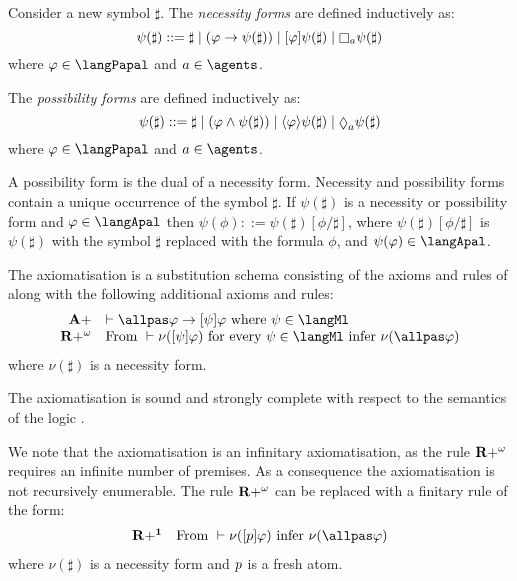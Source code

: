 \begin{definition}
Consider a new symbol $\sharp$. The {\em necessity forms} are defined inductively as:
$$\psi(\sharp) ::= \sharp \mid (\phi \implies \psi(\sharp)) \mid \announceA{\phi} \psi(\sharp) \mid \knows[\agentA] \psi(\sharp)$$
where $\phi \in \langPapal$ and $\agentA \in \agents$.

The {\em possibility forms} are defined inductively as:
$$\psi(\sharp) ::= \sharp \mid (\phi \land \psi(\sharp)) \mid \announceE{\phi} \psi(\sharp) \mid \suspects[\agentA] \psi(\sharp)$$
where $\phi \in \langPapal$ and $\agentA \in \agents$.
\end{definition}

A possibility form is the dual of a necessity form.
Necessity and possibility forms contain a unique occurrence of the symbol $\sharp$.
If $\psi(\sharp)$ is a necessity or possibility form and $\phi \in \langApal$ then $\psi(\phi) ::= \psi(\sharp)[\phi/\sharp]$, where $\psi(\sharp)[\phi/\sharp]$ is $\psi(\sharp)$ with the symbol $\sharp$ replaced with the formula $\phi$, and $\psi(\phi) \in \langApal$.

\begin{definition}
The axiomatisation \axiomApalS{} is a substitution schema consisting of the axioms and rules of \axiomPalS{} along with the following additional axioms and rules:
$$
\begin{array}{rl}
    {\bf A+} & \proves \allpas \phi \implies \announceA{\psi} \phi \text{ where } \psi  \in \langMl\\
    {\bf R+^\omega} & \text{From } \proves \nu(\announceA{\psi} \phi) \text{ for every } \psi \in \langMl \text{ infer } \nu(\allpas \phi)
\end{array}
$$
where $\nu(\sharp)$ is a necessity form.
\end{definition}

\begin{proposition}
The axiomatisation \axiomApalS{} is sound and strongly complete with respect to the semantics of the logic \logicApalS{}.
\end{proposition}

We note that the axiomatisation \axiomApalS{} is an infinitary axiomatisation, as the rule ${\bf R+^\omega}$ requires an infinite number of premises.
As a consequence the axiomatisation is not recursively enumerable.
The rule ${\bf R+^\omega}$ can be replaced with a finitary rule of the form:
$$
\begin{array}{rl}
    {\bf R+^1} & \text{From } \proves \nu(\announceA{\atomP} \phi) \text{ infer } \nu(\allpas \phi)
\end{array}
$$
where $\nu(\sharp)$ is a necessity form and $p$ is a fresh atom.

